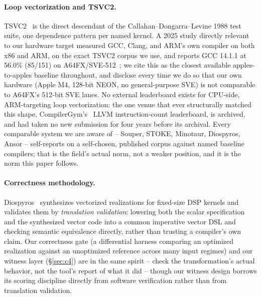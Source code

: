 \documentclass[sigconf,review,anonymous]{acmart}
\begin{document}
\paragraph{Loop vectorization and TSVC2.}
TSVC2~\cite{tsvc2} is the direct descendant of the Callahan--Dongarra--Levine
1988 test suite, one dependence pattern per named kernel. A 2025 study
directly relevant to our hardware target measured GCC, Clang, and ARM's own
compiler on both x86 and ARM, on the exact TSVC2 corpus we use, and reports
GCC 14.1.1 at 56.0\% (85/151) on A64FX/SVE-512~\cite{tsvc2-arm-x86}; we cite
this as the closest available apples-to-apples baseline throughout, and
disclose every time we do so that our own hardware (Apple M4, 128-bit NEON,
no general-purpose SVE) is not comparable to A64FX's 512-bit SVE lanes. No
external leaderboard exists for CPU-side, ARM-targeting loop vectorization:
the one venue that ever structurally matched this shape,
CompilerGym's~\cite{compilergym} LLVM instruction-count leaderboard, is
archived, and had taken no new submission for four years before its
archival. Every comparable system we are aware of -- Souper, STOKE,
Minotaur, Diospyros, Ansor -- self-reports on a self-chosen, published
corpus against named baseline compilers; that is the field's actual norm,
not a weaker position, and it is the norm this paper follows.

\paragraph{Correctness methodology.}
Diospyros~\cite{diospyros} synthesizes vectorized realizations for
fixed-size DSP kernels and validates them by \emph{translation
validation}: lowering both the scalar specification and the synthesized
vector code into a common imperative vector DSL and checking semantic
equivalence directly, rather than trusting a compiler's own claim. Our
correctness gate (a differential harness comparing an optimized realization
against an unoptimized reference across many input regimes) and our witness
layer (\S\ref{sec:c4}) are in the same spirit -- check the transformation's
actual behavior, not the tool's report of what it did -- though our witness
design borrows its scoring discipline directly from software verification
rather than from translation validation.
\end{document}

